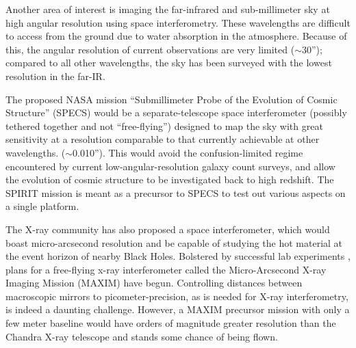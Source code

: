 \documentclass[12pt]{article}
\begin{document}
Another area of interest is imaging the far-infrared and
sub-millimeter sky at high angular resolution using space
interferometry.  These wavelengths are difficult to access from the
ground due to water absorption in the atmosphere.  Because of this,
the angular resolution of current observations are very limited
($\sim$30''); compared to all other wavelengths, the sky has been
surveyed with the lowest resolution in the far-IR.

The proposed NASA mission ``Submillimeter Probe of the Evolution of
Cosmic Structure'' (SPECS) would be a separate-telescope space
interferometer (possibly tethered together and not ``free-flying'')
designed to map the sky with great sensitivity at a resolution
comparable to that currently achievable at other wavelengths.
($\sim$0.010'').  This would avoid the confusion-limited regime
encountered by current low-angular-resolution galaxy count surveys,
and allow the evolution of cosmic structure to be investigated back to
high redshift.  The SPIRIT mission is meant as a precursor to SPECS to
test out various aspects on a single platform.

The X-ray community has also proposed a space interferometer, which
would boast micro-arcsecond resolution and be capable of studying the
hot material at the event horizon of nearby Black Holes.  Bolstered
by successful lab experiments \citep{cash2000}, plans for a
free-flying x-ray interferometer called the Micro-Arcsecond X-ray
Imaging Mission (MAXIM) have begun.  Controlling distances between
macroscopic mirrors to picometer-precision, as is needed for X-ray
interferometry, is indeed a daunting challenge. However, a MAXIM
precursor mission with only a few meter baseline would have orders of
magnitude greater resolution than the Chandra X-ray telescope and
stands some chance of being flown.
\end{document}
